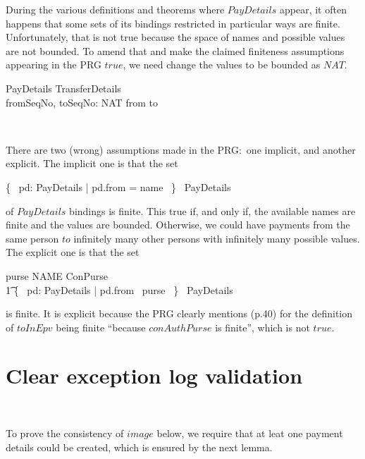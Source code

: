 During the various definitions and theorems where $PayDetails$
appear, it often happens that some sets of its bindings restricted
in particular ways are finite. Unfortunately, that is not true
because the space of names and possible values are not bounded.
To amend that and make the claimed finiteness assumptions appearing
in the PRG $true$, we need change the values to be bounded as $NAT$.
%
\begin{LSDef}
\begin{schema}{PayDetails}
    TransferDetails \\
    fromSeqNo, toSeqNo: NAT
\where
    from \neq to
\end{schema}~\end{LSDef}
%
There are two (wrong) assumptions made in the PRG:~one implicit,
and another explicit. The implicit one is that the set
%
\begin{gzed}
   \{~ pd: PayDetails | pd.from = name ~\} \in \finset~PayDetails
\end{gzed}
%
of $PayDetails$ bindings is finite. This true if, and only if, the available names
are finite and the values are bounded. Otherwise, we could have
payments from the same person $to$ infinitely many other persons with
infinitely many possible values. The explicit one is that the set
%
\begin{gzed}
   purse \in NAME \ffun ConPurse \implies \\ \t1
   \{~ pd: PayDetails | pd.from \in \dom~purse ~\} \in \finset~PayDetails
\end{gzed}
%
is finite. It is explicit because the PRG clearly mentions (p.40) for
the definition of $toInEpv$ being finite ``because $conAuthPurse$ is finite'',
which is not $true$.

\section{Clear exception log validation}

\begin{LGSet}
\begin{zed}
   [CLEAR]
\end{zed}~\end{LGSet}

To prove the consistency of $image$ below, we require that at
leat one payment details could be created, which is ensured by
the next lemma.
%

